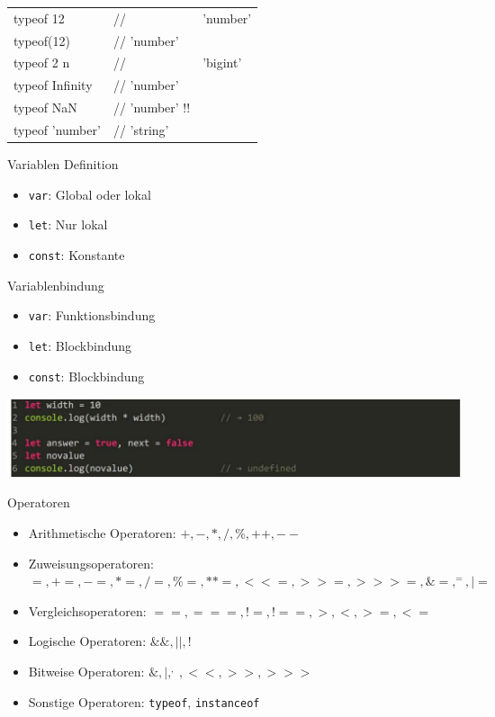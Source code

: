 \begin{center}
    \begin{tabular}{lll}
    \hline
    typeof 12 & // & 'number' \\
    typeof(12) & // 'number' &  \\
    typeof 2 n & // & 'bigint' \\
    typeof Infinity & // 'number' &  \\
    typeof NaN & // 'number' !! &  \\
    typeof 'number' & // 'string' &  \\
    \hline
    \end{tabular}
\end{center}

\begin{concept}{Variablen Definition}
    \begin{itemize}
        \item \texttt{var}: Global oder lokal
        \item \texttt{let}: Nur lokal
        \item \texttt{const}: Konstante
    \end{itemize}
\end{concept}

\begin{definition}{Variablenbindung}
    \begin{itemize}
        \item \texttt{var}: Funktionsbindung
        \item \texttt{let}: Blockbindung
        \item \texttt{const}: Blockbindung
    \end{itemize}
    \includegraphics[width=\linewidth]{images/2024_12_29_858f09cde51177c71657g-05}
\end{definition}

\begin{definition}{Operatoren}
    \begin{itemize}
        \item Arithmetische Operatoren: $+, -, *, /, \%, ++, --$
        \item Zuweisungsoperatoren: $=, +=, -=, *=, /=, \%=, **=, <<=, >>=, >>>=, \&=, ^=, |=$
        \item Vergleichsoperatoren: $==, ===, !=, !==, >, <, >=, <=$
        \item Logische Operatoren: $\&\&, ||, !$
        \item Bitweise Operatoren: $\&, |, ^, ~, <<, >>, >>>$
        \item Sonstige Operatoren: \texttt{typeof}, \texttt{instanceof}
    \end{itemize}
\end{definition}

